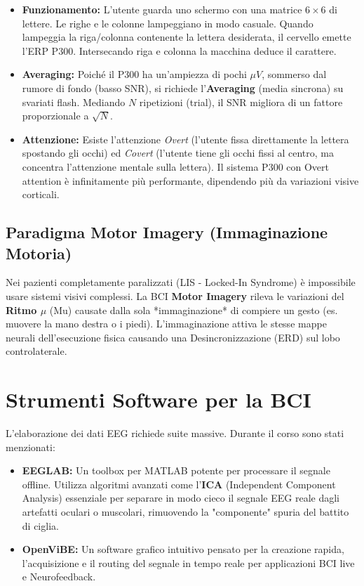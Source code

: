 \begin{itemize}
    \item \textbf{Funzionamento:} L'utente guarda uno schermo con una matrice $6 \times 6$ di lettere. Le righe e le colonne lampeggiano in modo casuale. Quando lampeggia la riga/colonna contenente la lettera desiderata, il cervello emette l'ERP P300. Intersecando riga e colonna la macchina deduce il carattere.
    \item \textbf{Averaging:} Poiché il P300 ha un'ampiezza di pochi $\mu V$, sommerso dal rumore di fondo (basso SNR), si richiede l'\textbf{Averaging} (media sincrona) su svariati flash. Mediando $N$ ripetizioni (trial), il SNR migliora di un fattore proporzionale a $\sqrt{N}$.
    \item \textbf{Attenzione:} Esiste l'attenzione \emph{Overt} (l'utente fissa direttamente la lettera spostando gli occhi) ed \emph{Covert} (l'utente tiene gli occhi fissi al centro, ma concentra l'attenzione mentale sulla lettera). Il sistema P300 con Overt attention è infinitamente più performante, dipendendo più da variazioni visive corticali.
\end{itemize}

\subsection{Paradigma Motor Imagery (Immaginazione Motoria)}
Nei pazienti completamente paralizzati (LIS - Locked-In Syndrome) è impossibile usare sistemi visivi complessi. La BCI \textbf{Motor Imagery} rileva le variazioni del \textbf{Ritmo $\mu$} (Mu) causate dalla sola *immaginazione* di compiere un gesto (es. muovere la mano destra o i piedi). L'immaginazione attiva le stesse mappe neurali dell'esecuzione fisica causando una Desincronizzazione (ERD) sul lobo controlaterale.

\section{Strumenti Software per la BCI}
L'elaborazione dei dati EEG richiede suite massive. Durante il corso sono stati menzionati:
\begin{itemize}
    \item \textbf{EEGLAB:} Un toolbox per MATLAB potente per processare il segnale offline. Utilizza algoritmi avanzati come l'\textbf{ICA} (Independent Component Analysis) essenziale per separare in modo cieco il segnale EEG reale dagli artefatti oculari o muscolari, rimuovendo la "componente" spuria del battito di ciglia.
    \item \textbf{OpenViBE:} Un software grafico intuitivo pensato per la creazione rapida, l'acquisizione e il routing del segnale in tempo reale per applicazioni BCI live e Neurofeedback.
\end{itemize}

